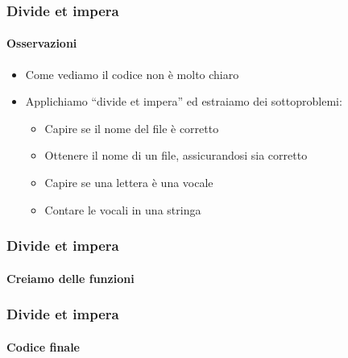 \begin{exampleframe}
    \frametitle{Divide et impera}
    \framesubtitle{Osservazioni}

    \begin{itemize}
        \item Come vediamo il codice non è molto chiaro

        \bigskip
        \item Applichiamo ``divide et impera'' ed estraiamo dei sottoproblemi:
        \begin{itemize}
            \item Capire se il nome del file è corretto
            \item Ottenere il nome di un file, assicurandosi sia corretto
            \item Capire se una lettera è una vocale
            \item Contare le vocali in una stringa
        \end{itemize}
    \end{itemize}
\end{exampleframe}

\begin{exampleframe}
    \frametitle{Divide et impera}
    \framesubtitle{Creiamo delle funzioni}

    \centering
\end{exampleframe}

\begin{exampleframe}
    \frametitle{Divide et impera}
    \framesubtitle{Codice finale}

    \centering
\end{exampleframe}

